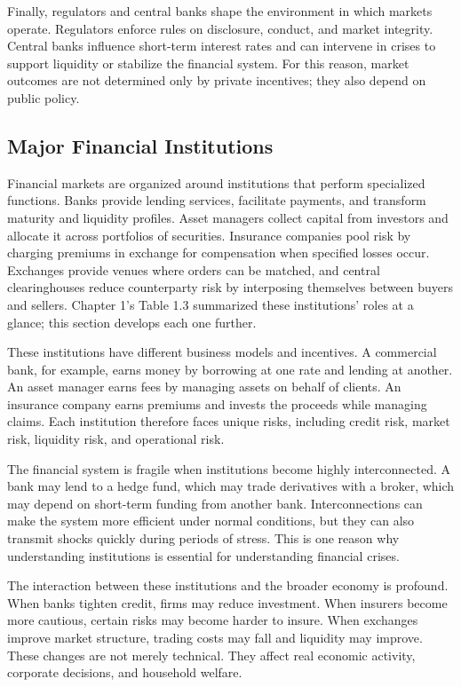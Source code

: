 \documentclass[../ai_in_finance]{subfiles}
\begin{document}
Finally, regulators and central banks shape the environment in which markets operate. Regulators enforce rules on disclosure, conduct, and market integrity. Central banks influence short-term interest rates and can intervene in crises to support liquidity or stabilize the financial system. For this reason, market outcomes are not determined only by private incentives; they also depend on public policy.

\subsection{Major Financial Institutions}

Financial markets are organized around institutions that perform specialized functions. Banks provide lending services, facilitate payments, and transform maturity and liquidity profiles. Asset managers collect capital from investors and allocate it across portfolios of securities. Insurance companies pool risk by charging premiums in exchange for compensation when specified losses occur. Exchanges provide venues where orders can be matched, and central clearinghouses reduce counterparty risk by interposing themselves between buyers and sellers. Chapter 1's Table 1.3 summarized these institutions' roles at a glance; this section develops each one further.

These institutions have different business models and incentives. A commercial bank, for example, earns money by borrowing at one rate and lending at another. An asset manager earns fees by managing assets on behalf of clients. An insurance company earns premiums and invests the proceeds while managing claims. Each institution therefore faces unique risks, including credit risk, market risk, liquidity risk, and operational risk.

The financial system is fragile when institutions become highly interconnected. A bank may lend to a hedge fund, which may trade derivatives with a broker, which may depend on short-term funding from another bank. Interconnections can make the system more efficient under normal conditions, but they can also transmit shocks quickly during periods of stress. This is one reason why understanding institutions is essential for understanding financial crises.

The interaction between these institutions and the broader economy is profound. When banks tighten credit, firms may reduce investment. When insurers become more cautious, certain risks may become harder to insure. When exchanges improve market structure, trading costs may fall and liquidity may improve. These changes are not merely technical. They affect real economic activity, corporate decisions, and household welfare.
\end{document}
